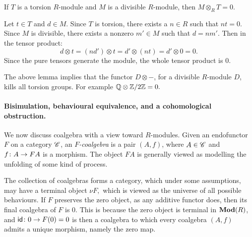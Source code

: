 \documentclass[runningheads]{llncs}
\begin{document}
\begin{propositionE}
\label{silentlemma}
    If $T$ is a torsion $R$-module and $M$ is a divisible $R$-module, then $M \otimes_{R} T = 0$.
\end{propositionE}
\begin{proofE}
    Let $t \in T$ and $d \in M$. Since $T$ is torsion, there exists a $n \in R$ such that $nt = 0$. Since $M$ is divisible, there exists a nonzero $m' \in M$ such that $d = nm'$. Then in the tensor product:
    $$
    d \otimes t = (nd') \otimes t = d' \otimes (nt) = d' \otimes 0 = 0.
    $$
    Since the pure tensors generate the module, the whole tensor product is 0.
\end{proofE}
The above lemma implies that the functor $D \otimes -$, for a divisible $R$-module $D$, kills all torsion groups. For example $\mathbb{Q}\otimes \mathbb{Z}/2\mathbb{Z} = 0.$

\paragraph*{Bisimulation, behavioural equivalence, and a cohomological obstruction.}
We now discuss coalgebra with a view toward $R$-modules. Given an endofunctor $F$ on a category $\mathscr{C}$, an \emph{$F$-coalgebra} is a pair $(A,f)$, where $A\in \mathscr{C}$ and $f\colon A\to FA$ is a morphism. The object $FA$ is generally viewed as modelling the unfolding of some kind of process.

The collection of coalgebras forms a category, which under some assumptions, may have a terminal object $\nu F,$ which is viewed as the universe of all possible behaviours. If $F$ preserves the zero object, as any additive functor does, then its final coalgebra of $F$ is $0$. This is because the zero object is terminal in $\operatorname{\mathbf{Mod}}(R)$, and $\mathsf{id} \colon 0 \to F(0) = 0$ is
then a coalgebra to which every coalgebra $(A, f)$ admits a unique morphism, namely the zero map.
\end{document}
